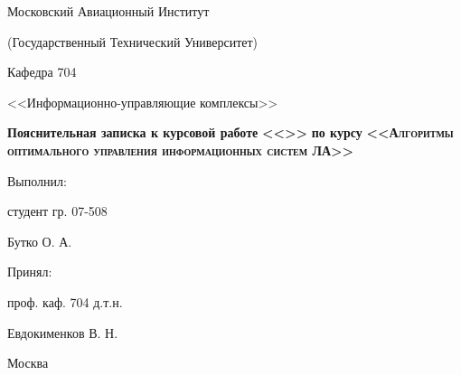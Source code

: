 \begin{titlepage}
\newpage
{}
\begin{center}
Московский Авиационный Институт

(Государственный Технический Университет)
\end{center}

\vspace{4em}

\begin{center}
    \LARGE Кафедра 704

    <<Информационно-управляющие комплексы>>
\end{center}

\vspace{2em}

\begin{center}
\textbf{Пояснительная записка к курсовой работе}
\Large \textsc{\textbf{
\lb
<<>>}}
\lb\lb
\textbf{по курсу}
\lb\lb
\Large \textsc{\textbf{
<<Алгоритмы оптимального управления
информационных систем ЛА>>
}}
\end{center}

\vspace{6em}

\begin{flushright}
Выполнил: 

студент гр. 07-508

Бутко О. А.

\vspace{1em}

Принял:

проф. каф. 704 д.т.н. 

Евдокименков В. Н.

\end{flushright}

\vspace{\fill}

\begin{center}
    Москва
\end{center}

\end{titlepage}
